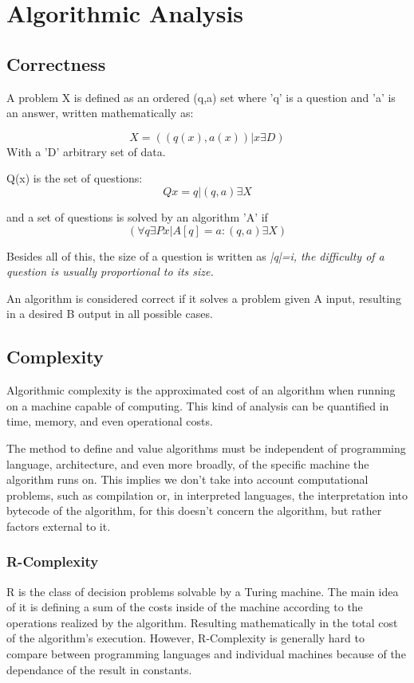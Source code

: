 \documentclass[12pt,a4paper,olive]{bbe}
\begin{document}
			
	\chapter*{Algorithmic Analysis}
	\section{Correctness}
	A problem X is defined as an ordered (q,a) set where 'q' is a question and 'a' is an answer, written mathematically as: 
 
	
	$$X={((q(x),a(x)) | x \exists D)}$$
	With a 'D' arbitrary set of data.
	
	Q(x) is the set of questions:
	$$ Qx = {q | (q, a) \exists X} $$

	and a set of questions is solved by an algorithm 'A' if
	$$ (\forall q \exists Px | A[q] = a :(q, a) \exists X) $$

	Besides all of this, the size of a question is written as 
	\it|q|=i\it, the difficulty of
	a question is usually proportional to its size.

	An algorithm is considered correct if it solves a problem given A input, resulting in a desired B output in all possible cases.
	
	\section{Complexity}
	Algorithmic complexity is the approximated cost of an algorithm when running on a machine capable of computing. This kind of analysis can be quantified in time, memory, and even operational costs.

	\begin{remark}
	The method to define and value algorithms must be independent of programming language, architecture, and even more broadly, of the specific machine the algorithm runs on. This implies we don't take into account computational problems, such as compilation or, in interpreted languages, the interpretation into bytecode of the algorithm, for this doesn't concern the algorithm, but rather factors external to it.   
	\end{remark}

	\subsection{R-Complexity}
	R is the class of decision problems solvable by a Turing machine. The main idea of it is defining a sum of the costs inside of the machine according to the operations realized by the algorithm. Resulting mathematically in the total cost of the algorithm's execution. However, R-Complexity is generally hard to compare between programming languages and individual machines because of the dependance of the result in constants.
\end{document}
